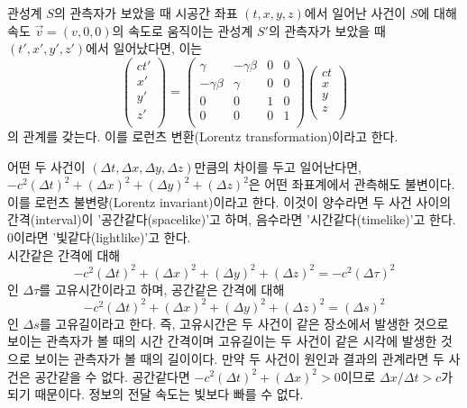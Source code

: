\begin{theorem}[로런츠 변환]
관성계 $S$의 관측자가 보았을 때 시공간 좌표 $(t, x,y,z)$에서 일어난 사건이 $S$에 대해 속도 $\vec{v}=(v,0,0)$의 속도로 움직이는 관성계 $S'$의 관측자가 보았을 때 $(t',x',y',z')$에서 일어났다면, 이는
\begin{equation}
\begin{pmatrix}
ct'\\
x'\\
y'\\
z'\\
\end{pmatrix}
= \begin{pmatrix}
\gamma& -\gamma\beta& 0& 0\\
-\gamma\beta & \gamma & 0 & 0 \\
0&0&1&0\\
0&0&0&1\\
\end{pmatrix}
\begin{pmatrix}
ct\\
x\\
y\\
z\\
\end{pmatrix}
\end{equation}
의 관계를 갖는다. 이를 로런츠 변환(Lorentz transformation)이라고 한다.
\end{theorem}
어떤 두 사건이 $(\Delta t, \Delta x, \Delta y, \Delta z)$만큼의 차이를 두고 일어난다면, $-c^2(\Delta t)^2 +(\Delta x)^2 + (\Delta y ) ^ 2 + (\Delta z)^2$은 어떤 좌표계에서 관측해도 불변이다. 이를 로런츠 불변량(Lorentz invariant)이라고 한다. 이것이 양수라면 두 사건 사이의 간격(interval)이 '공간같다(spacelike)'고 하며, 음수라면 '시간같다(timelike)'고 한다. 0이라면 '빛같다(lightlike)'고 한다.\\
시간같은 간격에 대해
\begin{equation}
-c^2(\Delta t)^2 +(\Delta x)^2 + (\Delta y ) ^ 2 + (\Delta z)^2=-c^2(\Delta \tau)^2
\end{equation}
인 $\Delta \tau$를 고유시간이라고 하며, 공간같은 간격에 대해
\begin{equation}
-c^2(\Delta t)^2 +(\Delta x)^2 + (\Delta y ) ^ 2 + (\Delta z)^2=(\Delta s)^2
\end{equation}
인 $\Delta s$를 고유길이라고 한다. 즉, 고유시간은 두 사건이 같은 장소에서 발생한 것으로 보이는 관측자가 볼 때의 시간 간격이며 고유길이는 두 사건이 같은 시각에 발생한 것으로 보이는 관측자가 볼 때의 길이이다. 만약 두 사건이 원인과 결과의 관계라면 두 사건은 공간같을 수 없다. 공간같다면 $-c^2(\Delta t)^2 +(\Delta x)^2 >0$이므로 $\Delta x/\Delta t>c$가 되기 때문이다. 정보의 전달 속도는 빛보다 빠를 수 없다.
